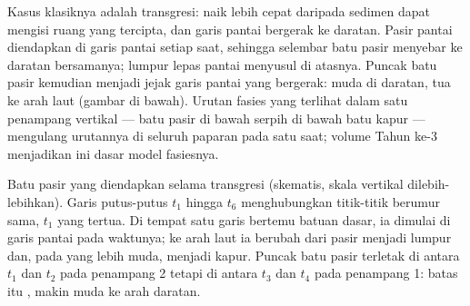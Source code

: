 Kasus klasiknya adalah transgresi:  naik lebih cepat daripada sedimen dapat mengisi ruang yang tercipta, dan garis pantai bergerak ke daratan. Pasir pantai diendapkan di garis pantai setiap saat, sehingga selembar batu pasir menyebar ke daratan bersamanya; lumpur lepas pantai menyusul di atasnya. Puncak batu pasir kemudian menjadi jejak garis pantai yang bergerak: muda di daratan, tua ke arah laut (gambar di bawah). Urutan fasies yang terlihat dalam satu penampang vertikal --- batu pasir di bawah serpih di bawah batu kapur --- mengulang urutannya di seluruh paparan pada satu saat; volume Tahun ke-3 menjadikan ini dasar model fasiesnya.

\begin{omfigure}

{\small Batu pasir yang diendapkan selama transgresi (skematis, skala vertikal dilebih-lebihkan). Garis putus-putus $t_1$ hingga $t_6$ menghubungkan titik-titik berumur sama, $t_1$ yang tertua. Di tempat satu garis bertemu batuan dasar, ia dimulai di garis pantai pada waktunya; ke arah laut ia berubah dari pasir menjadi lumpur dan, pada yang lebih muda, menjadi kapur. Puncak batu pasir terletak di antara $t_1$ dan $t_2$ pada penampang 2 tetapi di antara $t_3$ dan $t_4$ pada penampang 1: batas  itu , makin muda ke arah daratan.}
\label{fig:b1:stratigraphic-scale:diachronous}
\end{omfigure}


